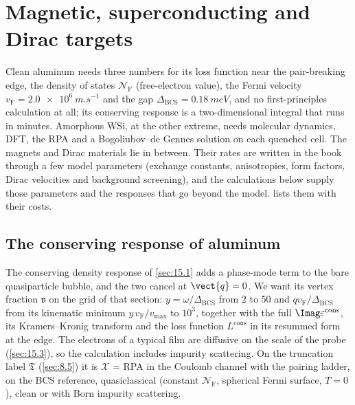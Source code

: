 \section{Magnetic, superconducting and Dirac targets}\label{app:E.20}

Clean aluminum needs three numbers for its loss function near the pair-breaking edge, the density of states $\mathcal{N}_{\mathrm{F}}$ (free-electron value), the Fermi velocity $v_{\mathrm{F}} = \SI{2.0e6}{m.s^{-1}}$ and the gap $\Delta_{\mathrm{BCS}} = \SI{0.18}{meV}$, and no first-principles calculation at all; its conserving response is a two-dimensional integral that runs in minutes. Amorphous WSi, at the other extreme, needs molecular dynamics, DFT, the RPA and a Bogoliubov--de Gennes solution on each quenched cell. The magnets and Dirac materials lie in between. Their rates are written in the book through a few model parameters (exchange constants, anisotropies, form factors, Dirac velocities and background screening), and the calculations below supply those parameters and the responses that go beyond the model.  lists them with their costs.

\subsection{The conserving response of aluminum}

The conserving density response of \cref{sec:15.1} adds a phase-mode term to the bare quasiparticle bubble, and the two cancel at $\vect{q} = 0$. We want its vertex fraction $\mathfrak{v}$ on the grid of that section: $y = \omega/\Delta_{\mathrm{BCS}}$ from 2 to 50 and $qv_{\mathrm{F}}/\Delta_{\mathrm{BCS}}$ from its kinematic minimum $y\,v_{\mathrm{F}}/v_{\mathrm{max}}$ to $10^3$, together with the full $\Imag\varepsilon^{\mathrm{cons}}$, its Kramers--Kronig transform and the loss function $L^{\mathrm{cons}}$ in its resummed form at the edge. The electrons of a typical film are diffusive on the scale of the probe (\cref{sec:15.3}), so the calculation includes impurity scattering. On the truncation label $\mathfrak{T}$ (\cref{sec:8.5}) it is $\mathcal{X}$ = RPA in the Coulomb channel with the pairing ladder, on the BCS reference, quasiclassical (constant $\mathcal{N}_{\mathrm{F}}$, spherical Fermi surface, $T = 0$), clean or with Born impurity scattering.

